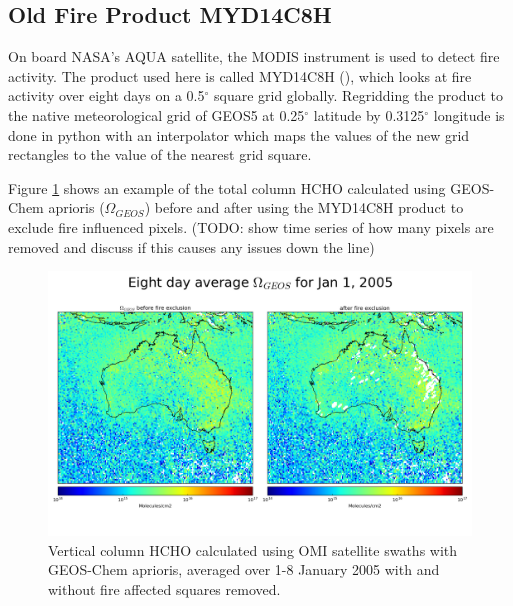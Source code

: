     
  \subsection{Old Fire Product MYD14C8H}
    
    On board NASA's AQUA satellite, the MODIS instrument is used to detect fire activity.
    The product used here is called MYD14C8H (\citep{Giglio2006}), which looks at fire activity over eight days on a 0.5$^{\circ}$ square grid globally.
    Regridding the product to the native meteorological grid of GEOS5 at 0.25$^{\circ}$ latitude by 0.3125$^{\circ}$ longitude is done in python with an interpolator which maps the values of the new grid rectangles to the value of the nearest grid square.
    
    Figure \ref{ch_HCHO:fig:fireexclusionexample} shows an example of the total column HCHO calculated using GEOS-Chem aprioris ($\Omega_{GEOS}$) before and after using the MYD14C8H product to exclude fire influenced pixels.
    (TODO: show time series of how many pixels are removed and discuss if this causes any issues down the line)
    
    \begin{figure}[!htbp]\begin{center}
      \includegraphics[width=\textwidth]{Figures/HCHO/fire_exclusion_aus_8d.png}
      \caption{Vertical column HCHO calculated using OMI satellite swaths with GEOS-Chem aprioris, averaged over 1-8 January 2005 with and without fire affected squares removed.}
      \label{ch_HCHO:fig:fireexclusionexample}
    \end{center}\end{figure}
      
